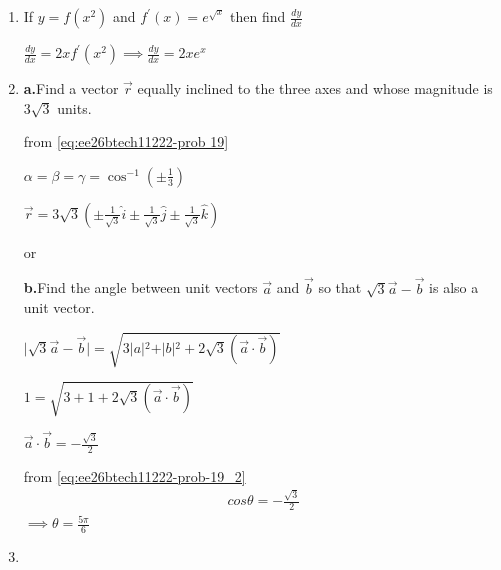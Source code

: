 \begin{enumerate}[label=\thesubsection.\arabic*, ref=\thesubsection.\theenumi]
\solution

from \eqref{eq:ee26btech11222-prob 17}

 
\begin{align}
x\frac{dy}{dx}-y= 2x^2 
\end{align} 
$$\implies\frac{dy}{dx}-\frac{y}{x} = 2x $$

$$ye^{\int -\frac{1}{x}dx} = \int 2xe^{\int -\frac{1}{x}dx}dx$$

integrating factor  $e^{\int -\frac{1}{x}dx}$


\item

If $y=f(x^{2})$ and $f^{\prime}(x)=e^{\sqrt{x}}$ then find $\frac{dy}{dx}$

\solution

$\frac{dy}{dx}= 2xf^\prime(x^2) \implies \frac{dy}{dx}= 2xe^x$


\item

\textbf{a.}Find a vector $\vec{r}$ equally inclined to the three axes and whose magnitude is $3\sqrt{3}$ units. 

\solution

from \eqref{eq:ee26btech11222-prob 19}

$\alpha =\beta=\gamma= \cos^{-1}(\pm\frac{1}{3})$

$\overrightarrow{r}=3\sqrt{3}\left(\pm\frac{1}{\sqrt{3}}\hat{i} \pm\frac{1}{\sqrt{3}}\hat{j} \pm\frac{1}{\sqrt{3}}\hat{k}\right)$ 

\begin{center}
    or
\end{center}


\textbf{b.}Find the angle between unit vectors $\vec{a}$ and $\vec{b}$ so that $\sqrt{3}\vec{a}-\vec{b}$ is also a unit vector.   

\solution


$\vert{}\sqrt{3}\vec{a}-\vec{b}\vert{}=\sqrt{3\vert{a}\vert{}^2 + \vert{b}\vert{}^2 +2\sqrt{3}\left(\vec{a}\cdot\vec{b}\right)}$

$1 = \sqrt{3 + 1 +2\sqrt{3}\left(\vec{a}\cdot\vec{b}\right)}$



$\vec{a}\cdot\vec{b}= -\frac{\sqrt{3}}{2} $

from \eqref{eq:ee26btech11222-prob-19_2}
\begin{align}
 cos\theta = -\frac{\sqrt{3}}{2}
\end{align}
$\implies \theta = \frac{5\pi}{6}$

\item


\end{enumerate}
